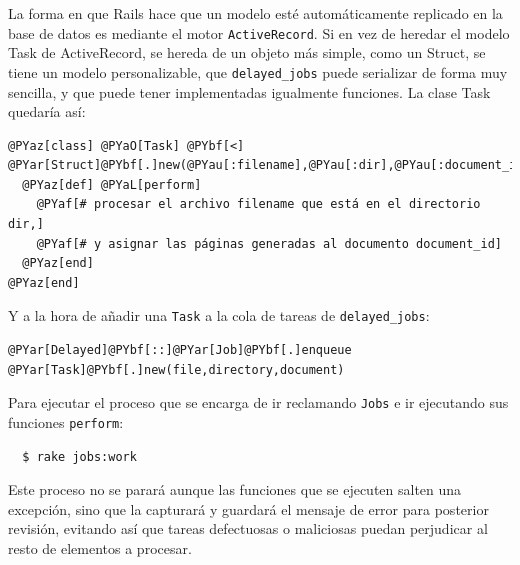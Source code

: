 La forma en que Rails hace que un modelo esté automáticamente replicado en la base de datos es mediante el motor \texttt{ActiveRecord}. Si en vez de heredar el modelo Task de ActiveRecord, se hereda de un objeto más simple, como un Struct, se tiene un modelo personalizable, que \texttt{delayed\_jobs} puede serializar de forma muy sencilla, y que puede tener implementadas igualmente funciones. La clase Task quedaría así:

\begin{Verbatim}[commandchars=@\[\]]
@PYaz[class] @PYaO[Task] @PYbf[<] @PYar[Struct]@PYbf[.]new(@PYau[:filename],@PYau[:dir],@PYau[:document_id])
  @PYaz[def] @PYaL[perform]
    @PYaf[# procesar el archivo filename que está en el directorio dir,]
    @PYaf[# y asignar las páginas generadas al documento document_id]
  @PYaz[end]    
@PYaz[end]
\end{Verbatim}



Y a la hora de añadir una \texttt{Task} a la cola de tareas de \texttt{delayed\_jobs}:


\begin{Verbatim}[commandchars=@\[\]]
  @PYar[Delayed]@PYbf[::]@PYar[Job]@PYbf[.]enqueue @PYar[Task]@PYbf[.]new(file,directory,document)
\end{Verbatim}


Para ejecutar el proceso que se encarga de ir reclamando \texttt{Jobs} e ir ejecutando sus funciones \texttt{perform}:

\begin{verbatim}
  $ rake jobs:work
\end{verbatim}

Este proceso no se parará aunque las funciones que se ejecuten salten una excepción, sino que la capturará y guardará el mensaje de error para posterior revisión, evitando así que tareas defectuosas o maliciosas puedan perjudicar al resto de elementos a procesar.


